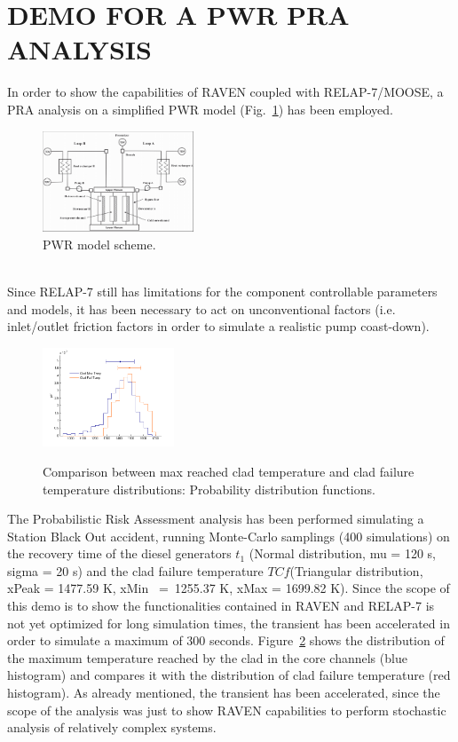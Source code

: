 \documentclass{anstrans}
\begin{document}
\section{DEMO FOR A PWR PRA ANALYSIS}
In order to show the capabilities of RAVEN coupled with RELAP-7/MOOSE, a PRA analysis on a simplified PWR model (Fig.~\ref{fig:PWRmodel}) has been employed.
\begin{figure}
   \centering
    \includegraphics[width=0.4\textwidth]{figures/PWR_TMI_SCHEME.PNG}
    \caption{PWR model scheme.}
    \label{fig:PWRmodel}
\end{figure}
\\Since RELAP-7 still has limitations for the component controllable parameters and models, it has been necessary to act on unconventional factors (i.e. inlet/outlet friction factors in order to simulate a realistic pump coast-down).
\begin{figure} [H]
\centering
  \centering
  \includegraphics[width=0.35\textwidth]{figures/PRA_dist2.png}
  \label{fig:pdf_temp}
   \caption{Comparison between max reached clad temperature and clad failure temperature distributions: Probability distribution functions.}
\label{fig:distributionResults}
\end{figure}

The Probabilistic Risk Assessment analysis has been performed simulating a Station Black Out accident, running Monte-Carlo samplings (400 simulations) on the recovery time of the diesel generators $t_{1}$ (Normal distribution, mu = 120 s, sigma = 20 s) and the clad failure temperature $TC{f}$(Triangular distribution, xPeak = 1477.59 K, xMin~ =~1255.37 K, xMax = 1699.82 K). Since the scope of this demo is to show the functionalities contained in RAVEN and RELAP-7 is not yet optimized for long simulation times, the transient has been accelerated in order to simulate a maximum of 300 seconds.
Figure~\ref{fig:distributionResults} shows the distribution of the maximum temperature reached by the clad in the core channels (blue histogram) and compares it with the distribution of clad failure temperature (red histogram).
As already mentioned, the transient has been accelerated, since the scope of the analysis was just to show RAVEN capabilities to perform stochastic analysis of relatively complex systems. %
\end{document}
